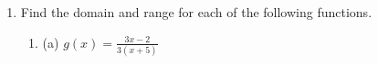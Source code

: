 \documentclass[11pt]{article}
\begin{document}
\begin{enumerate}
{{\[\begin{aligned} & \left[\begin{array}{cc|c} 3 & -12 & -9 \\ 1 & -3 & -1 \end{array}\right] \\ \xrightarrow{R_1 \leftrightarrow R_2} & \left[\begin{array}{cc|c} 1 & -3 & -1 \\ 3 & -12 & -9 \end{array}\right] \\ \xrightarrow{R_2 - 3R_1 \to R_2} & \left[\begin{array}{cc|c} 1 & -3 & -1 \\ 0 & -3 & -6 \end{array}\right] \\ \xrightarrow{\frac{R_2}{-3} \to R_2} & \left[\begin{array}{cc|c} 1 & -3 & -1 \\ 0 & 1 & 2 \end{array}\right] \\ \xrightarrow{R_1 + 3R_2 \to R_1} & \left[\begin{array}{cc|c} 1 & 0 & 5 \\ 0 & 1 & 2 \end{array}\right] \end{aligned}\]

\(\boxed{ (5, 2) }\)

}
}

\newpage

% 

\item %
\providecommand{\stxKnowl}{}\renewcommand{\stxKnowl}[1]{#1}
\providecommand{\stxOuttro}{}\renewcommand{\stxOuttro}[1]{#1}
\providecommand{\stxTitle}{}\renewcommand{\stxTitle}[1]{#1}
\renewcommand{\stxOuttro}[1]{}
\stxKnowl{
Find the domain and range for each of the following functions.

\begin{enumerate}
\item
\stxKnowl{
(a) \(g(x) = \displaystyle \frac{3x - 2}{3(x + 5)}\)

\stxOuttro{
Solution

\[x + 5 \neq 0 \implies x \neq -5\]

domain: \(\boxed{ x \neq -5 }\)

\[y = \frac{3}{3} = 3 \implies y \neq 3\]

}}
\end{enumerate}}
\end{enumerate}
\end{document}
